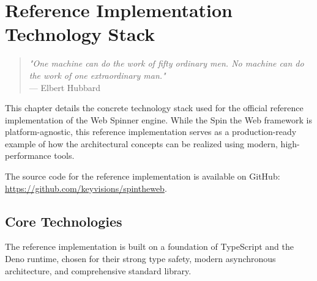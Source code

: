 \chapter{Reference Implementation Technology Stack}
\label{chap:implementation-tech}

\begin{quote}
\textit{"One machine can do the work of fifty ordinary men. No machine can do the work of one extraordinary man."} \\
— Elbert Hubbard
\end{quote}

This chapter details the concrete technology stack used for the official reference implementation of the Web Spinner engine. While the Spin the Web framework is platform-agnostic, this reference implementation serves as a production-ready example of how the architectural concepts can be realized using modern, high-performance tools.

The source code for the reference implementation is available on GitHub: \url{https://github.com/keyvisions/spintheweb}.

\section{Core Technologies}
\label{sec:core-technologies}

The reference implementation is built on a foundation of TypeScript and the Deno runtime, chosen for their strong type safety, modern asynchronous architecture, and comprehensive standard library.
